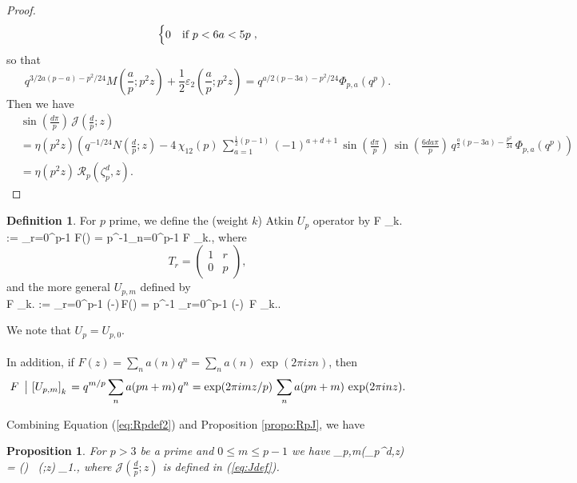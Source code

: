 \documentclass[12pt]{amsart}
\newtheorem{prop}[theorem]{Proposition}
\theoremstyle{definition}
\newtheorem{definition}[theorem]{Definition}
\theoremstyle{remark}
\numberwithin{equation}{section}
\newcommand{\Parans}[1]{\left(#1\right)}
\newcommand\Mac[3]{M\left(\frac{#1}{#2};#3\right)}
\newcommand\Nac[3]{N\left(\frac{#1}{#2};#3\right)}
\newcommand\Lpar[1]{\left(#1\right)}
\newcommand\Jdpz[1]{\mathcal{J}\left(\frac{d}{p};{#1}\right)}
\newcommand\Rpz[1]{\mathcal{R}_p\left(#1\right)}
\newcommand\stroke[3]{#1\,\left\arrowvert\,\left[#2\right]_{#3}\right.}
\newcommand\propo[1]{\ref{propo:#1}}
\newcommand\eqn[1]{(\ref{eq:#1})}
\begin{document}
\begin{proof}
$$\begin{cases}
0 & \mbox{if $ p < 6a < 5p$}
\end{cases},
$$
so that
$$
q^{3/2a(p-a)-p^2/24}\Mac{a}{p}{p^2z} + \frac{1}{2}
\varepsilon_2\Lpar{\frac{a}{p};p^2z}
= 
q^{a/2(p-3a)-p^2/24}{\Phi}_{p,a}(q^p).
$$
Then we have
\begin{align*}
&\sin\Lpar{\frac{d\pi}{p}} \, \Jdpz{z}{}\\
&=
\eta(p^2 z)\left(
q^{-1/24}\Nac{d}{p}{z}
- 
4\,\chi_{12}(p) \,
\sum_{a=1}^{\frac{1}{2}(p-1)} (-1)^{a + d + 1}
 \,
  \sin\Parans{\frac{d\pi}{p}}\,\sin\Parans{\frac{6da\pi}{p}}\,
q^{\tfrac{a}{2}(p-3a)-\tfrac{p^2}{24}}\,\Phi_{p,a}(q^p)\right)
\\
&=
\eta(p^2 z) \, \Rpz{\zeta_p^d,z}.
\end{align*}

\end{proof}

\begin{definition}
For $p$ prime, we define the (weight $k$) Atkin $U_p$ operator by
\beq
\stroke{F}{U_p}{k} :=  \sum_{r=0}^{p-1} F\Lpar{} 
= p^{-1}\sum_{n=0}^{p-1} \stroke{F}{T_r}{k},
\label{Updef}
\eeq
where
$$T_r = \begin{pmatrix} 1 & r \\ 0 & p \end{pmatrix},$$
and the more general $U_{p,m}$ defined by\\
\beq
\stroke{F}{U_{p,m}}{k} :=  \sum_{r=0}^{p-1} 
\exp\Lpar{-}\,F\Lpar{} 
= p^{-1} 
\sum_{r=0}^{p-1} \exp\Lpar{-}\, \stroke{F}{T_r}{k}. 
\label{Upkdef}
\eeq\\
\end{definition}
\noindent
We note that $U_p = U_{p,0}$. 
\\\\
In addition, if $F(z) = \sum\limits_n a(n) q^n = \sum\limits_n a(n)\,\exp(2\pi izn)$,
then 
\\
$$\stroke{F}{U_{p,m}}{k} = q^{m/p} \sum\limits_n a(pn+m)\,q^n = \exp(2\pi imz/p)\, \sum\limits_n a(pn+m)\,\exp(2\pi inz).$$

Combining Equation \eqn{Rpdef2} and Proposition \propo{RpJ}, we have
\begin{prop}
\label{propo:Kpm2}
For $p>3$ be a prime and $0 \le m \le p-1$ we have
\beq
{}_{p,m}(\zeta_p^d,z) =  \sin\Lpar{} \, 
\stroke{\Jdpz{z}{}}{U_{p,m}}{1},
\label{eq:Kpmdef}
\eeq
where $\Jdpz{z}{}$ is defined in \eqn{Jdef}.
\end{prop} 
\end{document}
